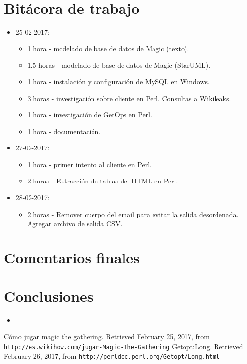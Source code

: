 \documentclass{IEEEtran}
\begin{document}
\section{Bit\'acora de trabajo}
\begin{itemize}
  \item 25-02-2017:
  \begin{itemize}
    \item 1 hora - modelado de base de datos de Magic (texto).
    \item 1.5 horas - modelado de base de datos de Magic (StarUML).
    \item 1 hora - instalaci\'on y configuraci\'on de MySQL en Windows.
    \item 3 horas - investigaci\'on sobre cliente en Perl. Consultas a Wikileaks.
    \item 1 hora - investigaci\'on de GetOps en Perl.
    \item 1 hora - documentaci\'on.
  \end{itemize}
  \item 27-02-2017:
  \begin{itemize}
    \item 1 hora - primer intento al cliente en Perl.
    \item 2 horas - Extracci\'on de tablas del HTML en Perl.
  \end{itemize}
  \item 28-02-2017:
  \begin{itemize}
    \item 2 horas - Remover cuerpo del email para evitar la salida desordenada. Agregar archivo de salida CSV.
  \end{itemize}
\end{itemize}

\section{Comentarios finales}

\section{Conclusiones}

\begin{itemize}
  \item 
\end{itemize}

\begin{thebibliography}{99}
  Cómo jugar magic the gathering. Retrieved February 25, 2017, from  \texttt{http://es.wikihow.com/jugar-Magic-The-Gathering}
  Getopt:Long. Retrieved February 26, 2017, from \texttt{http://perldoc.perl.org/Getopt/Long.html}
\end{thebibliography}
\end{document}
